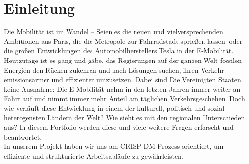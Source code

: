 \section{Einleitung}

Die Mobilität ist im Wandel – Seien es die neuen und vielversprechenden Ambitionen aus Paris, die die Metropole zur Fahrradstadt sprießen lassen, oder die großen Entwicklungen des Automobilherstellers Tesla in der E-Mobilität.
Heutzutage ist es gang und gäbe, das Regierungen auf der ganzen Welt fossilen Energien den Rücken zukehren und nach Lösungen suchen, ihren Verkehr emissionsarmer und effizienter umzusetzen. Dabei sind Die Vereinigten Staaten keine Ausnahme: Die E-Mobilität nahm in den letzten Jahren immer weiter an Fahrt auf und nimmt immer mehr Anteil am täglichen Verkehrsgeschehen.
Doch wie verläuft diese Entwicklung in einem der kulturell, politisch und sozial heterogensten Ländern der Welt? Wie sieht es mit den regionalen Unterschieden aus? In diesem Portfolio werden diese und viele weitere Fragen erforscht und beantwortet. \\
In unserem Projekt haben wir uns am CRISP-DM-Prozess orientiert, um effiziente und strukturierte Arbeitsabläufe zu gewährleisten.